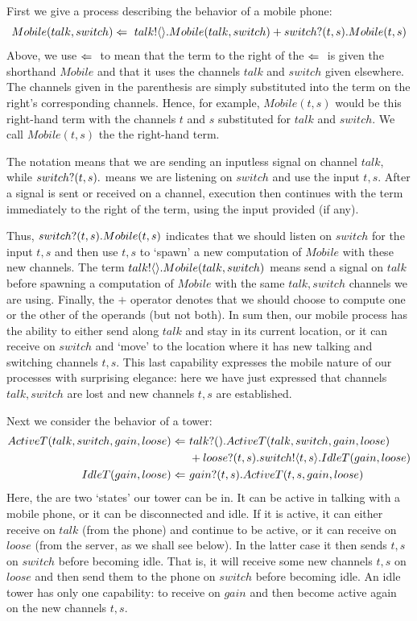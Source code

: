 	First we give a process describing the behavior of a mobile phone:
	\[
		Mobile(talk, switch) \Leftarrow\  {talk}!\langle{}\rangle. Mobile(talk,switch) + {switch}?({t,s}). Mobile(t,s)
	\]
	Above, we use $\Leftarrow\ $ to mean that the term to the right of the $\Leftarrow\ $ is given the shorthand $Mobile$ and that it uses the channels $talk$ and $switch$ given elsewhere.  The channels given in the parenthesis are simply substituted into the term on the right's corresponding channels.  Hence, for example, $Mobile(t,s)$ would be this right-hand term with the channels $t$ and $s$ substituted for $talk$ and $switch$. We call $Mobile(t,s)$ the  the right-hand term.
	
	The notation  means that we are sending an inputless signal on channel $talk$, while ${switch}?({t,s}).$ means we are listening on $switch$ and use the input $t,s$.  After a signal is sent or received on a channel, execution then continues with the term immediately to the right of the term, using the input provided (if any).  
	
	Thus, ${switch}?({t,s}). Mobile(t,s)$ indicates that we should listen on $switch$ for the input $t,s$ and then use $t,s$ to `spawn' a new computation of $Mobile$ with these new channels. The term ${talk}!\langle{}\rangle. Mobile(talk,switch)$ means send a signal on $talk$ before spawning a computation of $Mobile$ with the same $talk,switch$ channels we are using.  Finally, the $+$ operator denotes that we should choose to compute one or the other of the operands (but not both).  In sum then, our mobile process has the ability to either send along $talk$ and stay in its current location, or it can receive on $switch$ and `move' to the location where it has new talking and switching channels $t,s$.  This last capability expresses the mobile nature of our processes with surprising elegance: here we have just expressed that channels $talk,switch$ are lost and new channels $t,s$ are established.
	
	Next we consider the behavior of a tower:
	\begin{align*}
		ActiveT(talk,switch,gain,loose) \Leftarrow\  & {talk}?({}).ActiveT(talk,switch,gain,loose) \\  
		 & +{loose}?({t,s}).{switch}!\langle{t,s}\rangle.IdleT(gain, loose)\\
		IdleT(gain,loose) \Leftarrow\  & {gain}?({t,s}).ActiveT(t,s,gain,loose)\\
	\end{align*}
Here, the are two `states' our tower can be in.  It can be active in talking with a mobile phone, or it can be disconnected and idle.  If it is active, it can either receive on $talk$ (from the phone) and continue to be active, or it can receive on $loose$ (from the server, as we shall see below).  In the latter case it then sends $t,s$ on $switch$ before becoming idle.  That is, it will receive some new channels $t,s$ on $loose$ and then send them to the phone on $switch$ before becoming idle.  An idle tower has only one capability: to receive on $gain$ and then become active again on the new channels $t,s$.

